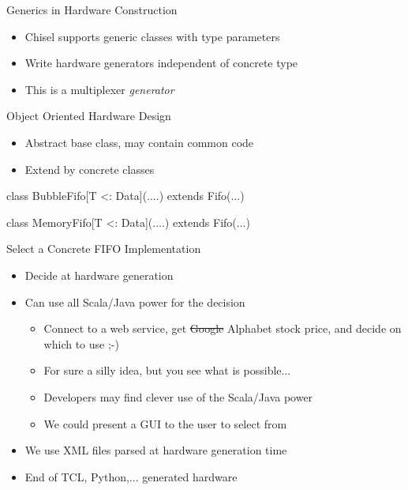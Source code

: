 \begin{frame}[fragile]{Generics in Hardware Construction}
\begin{itemize}
\item Chisel supports generic classes with type parameters
\item Write hardware generators independent of concrete type
\item This is a multiplexer \emph{generator}
\end{itemize}
\end{frame}


\begin{frame}[fragile]{Object Oriented Hardware Design}
\begin{itemize}
\item Abstract base class, may contain common code
\item Extend by concrete classes
\end{itemize}
\begin{chisel}
class BubbleFifo[T <: Data](....) extends Fifo(...)

class MemoryFifo[T <: Data](....) extends Fifo(...)

\end{chisel}
\end{frame}



\begin{frame}[fragile]{Select a Concrete FIFO Implementation}
\begin{itemize}
\item Decide at hardware generation
\item Can use all Scala/Java power for the decision
\begin{itemize}
\item Connect to a web service, get \sout{Google} Alphabet stock price, and decide on which to use ;-)
\item For sure a silly idea, but you see what is possible...
\item Developers may find clever use of the Scala/Java power
\item We could present a GUI to the user to select from
\end{itemize}
\item We use XML files parsed at hardware generation time
\item End of TCL, Python,... generated hardware
\end{itemize}
\end{frame}


